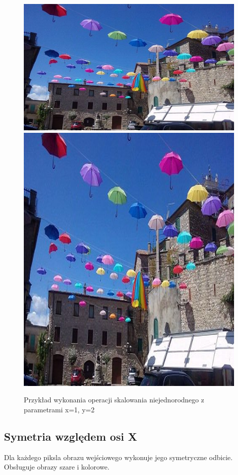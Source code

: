 \documentclass{article}
\begin{document}
\begin{figure}[!ht]
	\includegraphics[scale=0.7]{img/rgb-obraz1}	
	\includegraphics[scale=0.7]{img/geometryczne/skalowanie_niejednorodne-rgb}
	\caption{Przykład wykonania operacji skalowania niejednorodnego z parametrami x=1, y=2}
	\label{fig11}	
	\end{figure}

	
	\subsection{Symetria względem osi X}
	Dla każdego piksla obrazu wejściowego wykonuje jego symetryczne odbicie.
	Obsługuje obrazy szare i kolorowe.
	
\end{document}
